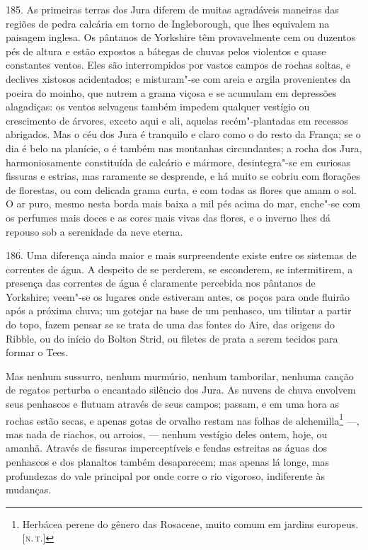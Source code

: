 185. As primeiras terras dos Jura diferem de muitas agradáveis maneiras
das regiões de pedra calcária em torno de Ingleborough, que lhes
equivalem na paisagem inglesa. Os pântanos de Yorkshire têm
provavelmente cem ou duzentos pés de altura e estão expostos a bátegas
de chuvas pelos violentos e quase constantes ventos. Eles são
interrompidos por vastos campos de rochas soltas, e declives xistosos
acidentados; e misturam"-se com areia e argila provenientes da poeira do
moinho, que nutrem a grama viçosa e se acumulam em depressões
alagadiças: os ventos selvagens também impedem qualquer vestígio ou
crescimento de árvores, exceto aqui e ali, aquelas recém"-plantadas em
recessos abrigados. Mas o céu dos Jura é tranquilo e claro como o do
resto da França; se o dia é belo na planície, o é também nas montanhas
circundantes; a rocha dos Jura, harmoniosamente constituída de calcário
e mármore, desintegra"-se em curiosas fissuras e estrias, mas raramente
se desprende, e há muito se cobriu com florações de florestas, ou com
delicada grama curta, e com todas as flores que amam o sol. O ar puro,
mesmo nesta borda mais baixa a mil pés acima do mar, enche"-se com os
perfumes mais doces e as cores mais vivas das flores, e o inverno lhes
dá repouso sob a serenidade da neve eterna.

186. Uma diferença ainda maior e mais surpreendente existe entre os
sistemas de correntes de água. A despeito de se perderem, se esconderem,
se intermitirem, a presença das correntes de água é claramente percebida
nos pântanos de Yorkshire; veem"-se os lugares onde estiveram antes, os
poços para onde fluirão após a próxima chuva; um gotejar na base de um
penhasco, um tilintar a partir do topo, fazem pensar se se trata de uma
das fontes do Aire, das origens do Ribble, ou do início do Bolton Strid,
ou filetes de prata a serem tecidos para formar o Tees.

Mas nenhum sussurro, nenhum murmúrio, nenhum tamborilar, nenhuma canção
de regatos perturba o encantado silêncio dos Jura. As nuvens de chuva
envolvem seus penhascos e flutuam através de seus campos; passam, e em
uma hora as rochas estão secas, e apenas gotas de orvalho restam nas
folhas de alchemilla\footnote{Herbácea perene do gênero das Rosaceae,
  muito comum em jardins europeus. {[}\textsc{n.\,t.}{]}} ---, mas nada de
riachos, ou arroios, --- nenhum vestígio deles ontem, hoje, ou amanhã.
Através de fissuras imperceptíveis e fendas estreitas as águas dos
penhascos e dos planaltos também desaparecem; mas apenas lá longe, mas
profundezas do vale principal por onde corre o rio vigoroso, indiferente
às mudanças.

